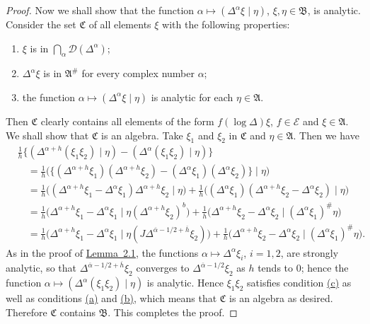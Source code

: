 \documentclass[12pt,b5paper,twoside]{article}
\theoremstyle{takesaki}
\numberwithin{equation}{section}
\begin{document}
\begin{proof}
Now we shall show that the function
$\alpha\mapsto(\Delta^\alpha\xi\mid\eta)$,
$\xi,\eta\in\mathfrak B$, is
analytic.  Consider the set $\mathfrak C$ of all elements $\xi$ with
the following properties:
\begin{enumerate}[label=(\alph*)]
 \item\label{cond:10:c:a} $\xi$ is in $\bigcap_\alpha\mathcal D(\Delta^\alpha)$;
 \item\label{cond:10:c:b} $\Delta^\alpha\xi$ is in $\mathfrak A^{\#}$ for every complex
 number $\alpha$;
 \item\label{cond:10:c:c} the function $\alpha\mapsto(\Delta^\alpha\xi\mid\eta)$ is
 analytic for each $\eta\in\mathfrak A$.
\end{enumerate}
Then $\mathfrak C$ clearly contains all elements of the form
$f(\log\Delta)\xi$, $f\in\mathcal E$ and $\xi\in\mathfrak A$.  We
shall show that $\mathfrak C$ is an algebra.  Take $\xi_1$ and
$\xi_2$ in $\mathfrak C$ and $\eta\in\mathfrak A$.  Then we have
\begin{align*}
 &\frac1h\{(\Delta^{\alpha+h}(\xi_1\xi_2)\mid\eta)
 -(\Delta^\alpha(\xi_1\xi_2)\mid\eta)\}\\
 &\quad=\frac1h\bigl(\{(\Delta^{\alpha+h}\xi_1)
   (\Delta^{\alpha+h}\xi_2)
  -(\Delta^\alpha\xi_1)(\Delta^\alpha\xi_2)\}\mid\eta\bigr)\\
 &\quad=\frac1h\bigl((\Delta^{\alpha+h}\xi_1-\Delta^\alpha\xi_1)
       \Delta^{\alpha+h}\xi_2\mid\eta\bigr)
  +\frac1h\bigl((\Delta^\alpha\xi_1)
       (\Delta^{\alpha+h}\xi_2-\Delta^\alpha\xi_2)\mid\eta\bigr)\\
 &\quad=\frac1h\bigl(\Delta^{\alpha+h}\xi_1-\Delta^\alpha\xi_1
       \mid\eta(\Delta^{\alpha+h}\xi_2)^b\bigr)
  +\frac1h\bigl(\Delta^{\alpha+h}\xi_2-\Delta^\alpha\xi_2
       \mid(\Delta^\alpha\xi_1)^{\#}\eta\bigr)\\
 &\quad=\frac1h\bigl(\Delta^{\alpha+h}\xi_1-\Delta^\alpha\xi_1
       \mid\eta(J\Delta^{\overline\alpha-1/2+\overline h}\xi_2)\bigr)
  +\frac1h\bigl(\Delta^{\alpha+h}\xi_2-\Delta^\alpha\xi_2
       \mid(\Delta^\alpha\xi_1)^{\#}\eta\bigr).
\end{align*}
As in the proof of \hyperref[lem:2.1]{Lemma~2.1}, the functions
$\alpha\mapsto\Delta^\alpha\xi_i$, $i=1,2$, are strongly analytic, so
that $\Delta^{\overline\alpha-1/2+\overline h}\xi_2$ converges to
$\Delta^{\overline\alpha-1/2}\xi_2$ as $h$ tends to $0$; hence the
function $\alpha\mapsto(\Delta^\alpha(\xi_1\xi_2)\mid\eta)$ is
analytic.  Hence $\xi_1\xi_2$ satisfies condition
\hyperref[cond:10:c:c]{(c)} as well as conditions
\hyperref[cond:10:c:a]{(a)} and \hyperref[cond:10:c:b]{(b)}, which means that $\mathfrak C$ is an algebra
as desired.  Therefore $\mathfrak C$ contains $\mathfrak B$.  This
completes the proof.
\end{proof}
\end{document}
